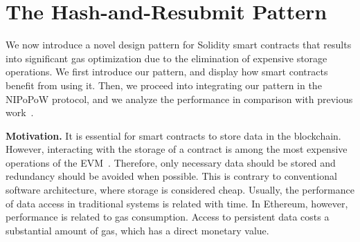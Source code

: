 \section{The Hash-and-Resubmit Pattern}

We now introduce a novel design pattern for Solidity smart contracts that
results into significant gas optimization due to the elimination of expensive
storage operations. We first introduce our pattern, and display how smart
contracts benefit from using it. Then, we proceed into integrating our pattern
in the NIPoPoW protocol, and we analyze the performance in comparison with
previous work~\cite{gglou}.

\textbf{Motivation.}
It is essential for smart contracts to store data in the blockchain. However,
interacting with the storage of a contract is among the most expensive
operations of the EVM~\cite{wood, buterin}. Therefore, only necessary data
should be stored and redundancy should be avoided when possible. This is
contrary to conventional software architecture, where storage is considered
cheap. Usually, the performance of data access in traditional systems is
related with time. In Ethereum, however, performance is related to gas
consumption. Access to persistent data costs a substantial amount of gas, which
has a direct monetary value.


